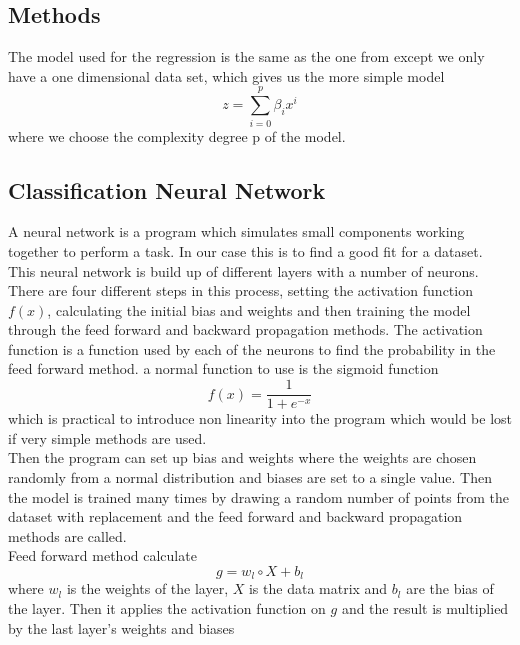 \documentclass[11pt, A4paper, english]{article}
\begin{document}
\begin{multicols}{2}
		\section{Methods}
The model used for the regression is the same as the one from \cite{Project 1} except we only have a one dimensional data set, which gives us the more simple model
			\begin{equation}
z = \sum_{i = 0}^{p} \beta_{i} x^{i}
			\end{equation}
where we choose the complexity degree p of the model.

			\subsection{Classification Neural Network}
A neural network is a program which simulates small components working together to perform a task. In our case this is to find a good fit for a dataset. This neural network is build up of different layers with a number of neurons. There are four different steps in this process, setting the activation function $f(x)$, calculating the initial bias and weights and then training the model through the feed forward and backward propagation methods. The activation function is a function used by each of the neurons to find the probability in the feed forward method. a normal function to use is the sigmoid function
				\begin{equation}
f(x) = \frac{1}{1 + e^{-x}}
				\end{equation}
which is practical to introduce non linearity into the program which would be lost if very simple methods are used. \\
Then the program can set up bias and weights where the weights are chosen randomly from a normal distribution and biases are set to a single value. Then the model is trained many times by drawing a random number of points from the dataset with replacement and the feed forward and backward propagation methods are called. \\
Feed forward method calculate
				\begin{equation}
g = w_l \circ X + b_l
				\end{equation}
where $w_l$ is the weights of the layer, $X$ is the data matrix and $b_l$ are the bias of the layer. Then it applies the activation function on $g$ and the result is multiplied by the last layer's weights and biases

\end{multicols}
\end{document}

